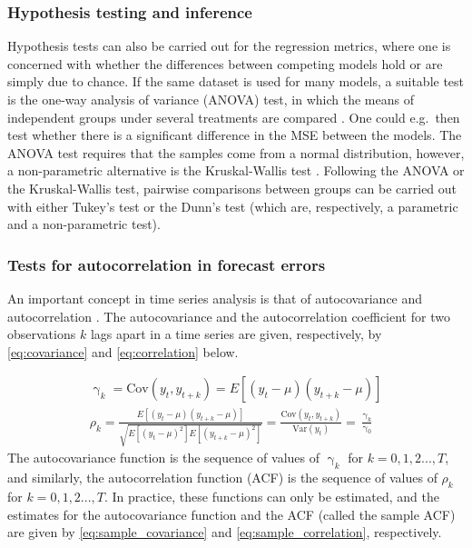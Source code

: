 \subsubsection{Hypothesis testing and inference}
Hypothesis tests can also be carried out for the regression metrics, where one is concerned with whether the differences between competing models hold or are simply due to chance. If the same dataset is used for many models, a suitable test is the one-way analysis of variance (ANOVA) test, in which the means of independent groups under several treatments are compared \cite{Wackerly2007}. One could e.g.\ then test whether there is a significant difference in the MSE between the models. The ANOVA test requires that the samples come from a normal distribution, however, a non-parametric alternative is the Kruskal-Wallis test \cite{Wackerly2007}. Following the ANOVA or the Kruskal-Wallis test, pairwise comparisons between groups can be carried out with either Tukey's test or the Dunn's test (which are, respectively, a parametric and a non-parametric test).  

\subsubsection{Tests for autocorrelation in forecast errors}
\label{sec:auto_errors}
An important concept in time series analysis is that of autocovariance and autocorrelation \cite{Montgomery2015}. The autocovariance and  the autocorrelation coefficient for two observations $k$ lags apart in a time series are given, respectively, by \cref{eq:covariance} and \cref{eq:correlation} below.  

\begin{gather}
     \upgamma_k = \text{Cov}(y_t, y_{t+k}) = E[(y_t - \mu)(y_{t+k} - \mu)] \label{eq:covariance} \\[1ex]
     \rho_k = \frac{E[(y_t - \mu)(y_{t+k} - \mu)]}{\sqrt{E[(y_t - \mu)^2]E[(y_{t+k} - \mu)^2]}} = \frac{\text{Cov}(y_t, y_{t+k})}{\text{Var}(y_t)} = \frac{\upgamma_k}{\upgamma_0}\label{eq:correlation}
\end{gather}
The autocovariance function is the sequence of values of $\upgamma_k$ for $k=0,1,2 ..., T$, and similarly, the autocorrelation function (ACF) is the sequence of values of $\rho_k$ for $k=0,1,2 ..., T$. In practice, these functions can only be estimated, and the estimates for the autocovariance function and the ACF (called the sample ACF) are given by \cref{eq:sample_covariance} and \cref{eq:sample_correlation}, respectively.

